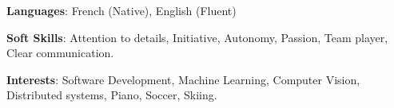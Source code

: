 
\begin{cventries}

  \cventryline
    {} %
    {} %
    {} %
    {} %
    {
    \begin{cvitems} %
        \item {{\bf Languages}: French (Native), English (Fluent)}
        \item {{\bf Soft Skills}: Attention to details, Initiative, Autonomy, Passion, Team player, Clear communication.}
        \item {{\bf Interests}: Software Development, Machine Learning, Computer Vision, Distributed systems, Piano, Soccer, Skiing.}
    \end{cvitems}
    }


\end{cventries}


